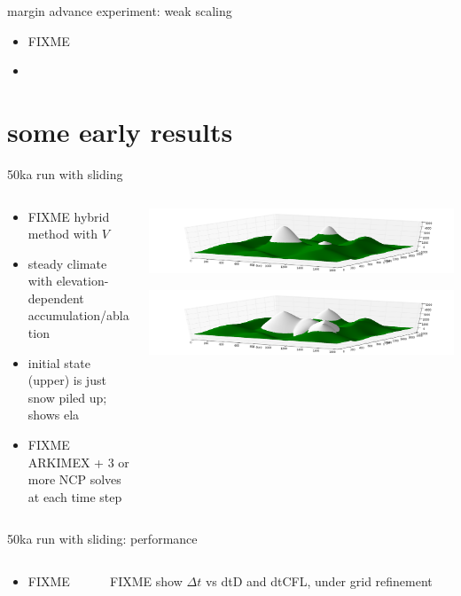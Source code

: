 \documentclass[hide notes,intlimits,usenames,dvipsnames]{beamer}
\begin{document}
\begin{frame}{margin advance experiment:  weak scaling}
\begin{itemize}
\item FIXME
\item 
\end{itemize}
\end{frame}


\section{some early results}

\begin{frame}{50ka run with sliding}
\begin{columns}
\begin{column}{0.4\textwidth}
\begin{itemize}
\item FIXME hybrid method with $V$
\item steady climate with elevation-dependent accumulation/ablation
\item initial state (upper) is just snow piled up; shows ela
\item FIXME ARKIMEX + $3$ or more NCP solves at each time step
\end{itemize}
\end{column}
\begin{column}{0.6\textwidth}
\includegraphics[width=\textwidth]{startsheet.png}

\includegraphics[width=\textwidth]{endsheet.png}
\end{column}
\end{columns}
\end{frame}

\begin{frame}{50ka run with sliding: performance}
\begin{columns}
\begin{column}{0.4\textwidth}
\begin{itemize}
\item FIXME
\end{itemize}
\end{column}
\begin{column}{0.6\textwidth}
FIXME  show $\Delta t$ vs dtD and dtCFL, under grid refinement
\end{column}
\end{columns}
\end{frame}
\end{document}
